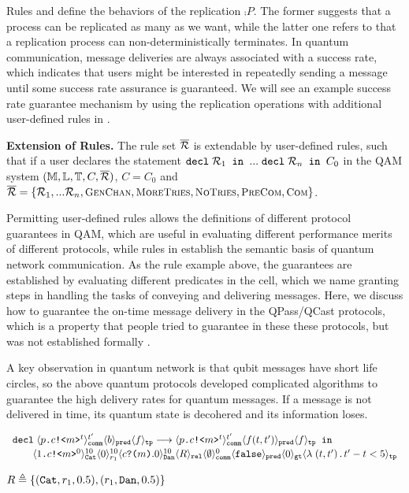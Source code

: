 Rules  and  define the behaviors of the replication $\comp{P}$.
The former suggests that a process can be replicated as many as we want, while the latter one refers to that a replication process can non-deterministically terminates.
In quantum communication, message deliveries are always associated with a success rate,
which indicates that users might be interested in repeatedly sending a message until some success rate assurance is guaranteed.
We will see an example success rate guarantee mechanism by using the replication operations with additional user-defined rules in .

\noindent\textbf{Extension of Rules.}
The rule set $\overline{\mathcal{R}}$ is extendable by user-defined rules, 
such that if a user declares the statement $\texttt{decl}\;\mathcal{R}_1\texttt{ in }...\; \texttt{decl}\;\mathcal{R}_n\texttt{ in }C_0$
in the QAM system $(\mathbb{M},\mathbb{L},\mathbb{T},C,\overline{\mathcal{R}})$, $C=C_0$ and $\overline{\mathcal{R}}=\{\mathcal{R}_1,...\mathcal{R}_n,{\small \textsc{GenChan}},{\small \textsc{MoreTries}},{\small \textsc{NoTries}}, {\small \textsc{PreCom}},{\small \textsc{Com}}\}$.

Permitting user-defined rules allows the definitions of different protocol guarantees in QAM,
which are useful in evaluating different performance merits of different protocols,
while rules in  establish the semantic basis of quantum network communication.
As the  rule example above, the guarantees are established by evaluating different predicates in the  cell,
which we name granting steps in handling the tasks of conveying and delivering messages.
Here, we discuss how to guarantee the on-time message delivery in the QPass/QCast protocols,
which is a property that people tried to guarantee in these these protocols, but was not established formally \cite{10.1145/3387514.3405853}.

A key observation in quantum network is that qubit messages have short life circles,
so the above quantum protocols developed complicated algorithms to guarantee the high delivery rates for quantum messages.
If a message is not delivered in time, its quantum state is decohered and its information loses.

{\footnotesize
\[
\begin{array}{l}
\texttt{decl}\;\langle p\texttt{.}c\texttt{!<}m\texttt{>}^t \rangle^{t'}_{\texttt{comm}}\langle b \rangle_{\texttt{pred}}\langle f \rangle_{\texttt{tp}} 
     \longrightarrow \langle p\texttt{.}c\texttt{!<}m\texttt{>}^t \rangle^{t'}_{\texttt{comm}}\langle f(t,t') \rangle_{\texttt{pred}}\langle f \rangle_{\texttt{tp}}\texttt{ in }
\\[0.2em]
\qquad
\langle 1\texttt{.}c\texttt{!<}m\texttt{>}^0 \rangle^{10}_{\texttt{Cat}}\langle 0 \rangle^{10}_{r_1}
\langle c\texttt{?(}m\texttt{)}.0 \rangle^{10}_{\texttt{Dan}} 
\langle R \rangle_{\texttt{rel}}
\langle \emptyset \rangle^{0}_{\texttt{comm}}
\langle \texttt{false} \rangle_{\texttt{pred}}
\langle 0 \rangle_{\texttt{gt}}
\langle \lambda\;(t,t')\,.\,t'-t<5 \rangle_{\texttt{tp}}
\end{array}
\]
}
{\footnotesize
\begin{center}
$R\triangleq\{(\texttt{Cat},r_1,0.5), (r_1,\texttt{Dan},0.5)\}$
\end{center}
}

